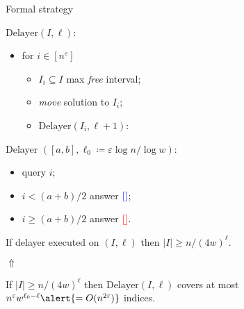 \begin{frame}{Formal strategy}

    \begin{minipage}[c]{0.45\linewidth}
        $\text{Delayer}(I, \ell)$:
        \begin{itemize}
            \item for $i \in [n^{\varepsilon}]$
                \begin{itemize}
                    \item $I_i \subseteq I$ max \emph{free} interval;
                    \item \emph{move} solution to $I_i$;
                    \item $\text{Delayer}(I_i, \ell + 1)$:                        
                \end{itemize}
        \end{itemize}        
    \end{minipage}
    \begin{minipage}[c]{0.45\linewidth}
        Delayer $([a, b], \ell_0 \coloneqq \varepsilon \log n / \log w)$:
        \begin{itemize}
            \item query $i$;
            \item $i < (a + b) / 2$ answer $\textcolor{blue}{[]}$;
            \item $i \ge (a + b) / 2$ answer $\textcolor{red}{[]}$.
        \end{itemize}        
    \end{minipage}

    \pause
    \begin{lemma}
        If delayer executed on $(I, \ell)$ then $|I| \ge n / (4w)^{\ell}$.
    \end{lemma}
    \pause
    \begin{center}
        $\Uparrow$
    \end{center}
    \vspace{-0.2cm}
    \begin{lemma}
        If $|I| \ge n / (4w)^{\ell}$ then $\text{Delayer}(I, \ell)$ covers at most $n^{\varepsilon}
        w^{\ell_0 - \ell} \alert{= O(n^{2 \varepsilon})}$ indices. 
    \end{lemma}
        

    
\end{frame}